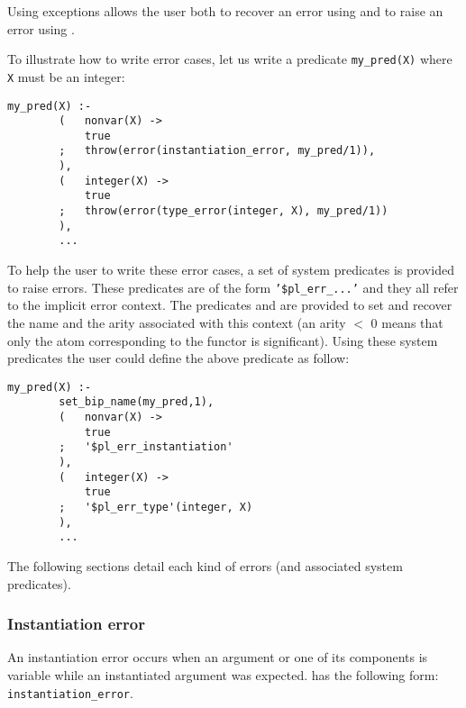 Using exceptions allows the user both to recover an error using
  and to raise an error using
 .

To illustrate how to write error cases, let us write a predicate
\texttt{my\_pred(X)} where \texttt{X} must be an integer:

\begin{Indentation}
\begin{verbatim}
my_pred(X) :-
        (   nonvar(X) ->
            true
        ;   throw(error(instantiation_error, my_pred/1)),
        ),
        (   integer(X) ->
            true
        ;   throw(error(type_error(integer, X), my_pred/1))
        ),
        ...
\end{verbatim}
\end{Indentation}

To help the user to write these error cases, a set of system predicates is
provided to raise errors. These predicates are of the form
\texttt{'\$pl\_err\_...'} and they all refer to the implicit error context.
The predicates   and
  are provided to
set and recover the name and the arity associated with this context (an arity
$<$ 0 means that only the atom corresponding to the functor is significant).
Using these system predicates the user could define the above predicate as
follow:

\begin{Indentation}
\begin{verbatim}
my_pred(X) :-
        set_bip_name(my_pred,1),
        (   nonvar(X) ->
            true
        ;   '$pl_err_instantiation'
        ),
        (   integer(X) ->
            true
        ;   '$pl_err_type'(integer, X)
        ),
        ...
\end{verbatim}
\end{Indentation}

The following sections detail each kind of errors (and associated system
predicates).

\subsubsection{Instantiation error}
\label{Instantiation-error}
An instantiation error occurs when an argument or one of its components is
variable while an instantiated argument was expected.
 has the following form:
\texttt{instantiation\_error}.

